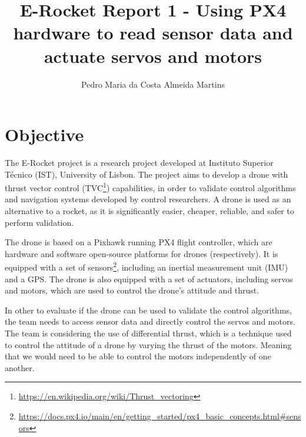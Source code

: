 \documentclass[a4paper]{article}
\begin{document}
\title{E-Rocket Report 1 - Using PX4 hardware to read sensor data and actuate servos and motors}
\author{Pedro Maria da Costa Almeida Martins}

\maketitle
\thispagestyle{empty}
\clearpage


\tableofcontents
\thispagestyle{empty}
\clearpage



\section{Objective}

The E-Rocket project is a research project developed at Instituto Superior Técnico (IST), University of Lisbon. 
The project aims to develop a drone with thrust vector control (TVC\footnote{\url{https://en.wikipedia.org/wiki/Thrust_vectoring}}) capabilities, in order to validate control algorithms and navigation systems developed by control researchers. 
A drone is used as an alternative to a rocket, as it is significantly easier, cheaper, reliable, and safer to perform validation.

The drone is based on a Pixhawk running PX4 flight controller, which are hardware and software open-source platforms for drones (respectively). 
It is equipped with a set of sensors\footnote{\url{https://docs.px4.io/main/en/getting_started/px4_basic_concepts.html\#sensors}}, including an inertial measurement unit (IMU) and a GPS. 
The drone is also equipped with a set of actuators, including servos and motors, which are used to control the drone's attitude and thrust.

In other to evaluate if the drone can be used to validate the control algorithms, the team needs to access sensor data and directly control the servos and motors. 
The team is considering the use of differential thrust, which is a technique used to control the attitude of a drone by varying the thrust of the motors. Meaning that we would need to be able to control the motors independently of one another.
\end{document}
